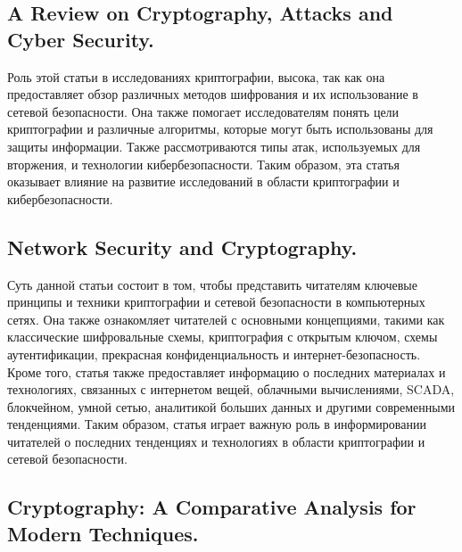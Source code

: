 \documentclass[14pt]{extarticle}
\begin{document}
\subsection{A Review on Cryptography, Attacks and Cyber Security.\cite{Article10}}

Роль этой статьи  в исследованиях криптографии, высока, так как она предоставляет обзор различных методов шифрования и их использование в сетевой безопасности. Она также помогает исследователям понять цели криптографии и различные алгоритмы, которые могут быть использованы для защиты информации.  Также рассмотриваются типы атак, используемых для вторжения, и технологии кибербезопасности. Таким образом, эта статья оказывает влияние на развитие исследований в области криптографии и кибербезопасности.

\subsection{Network Security and Cryptography.\cite{Article11}}
Суть данной статьи состоит в том, чтобы представить читателям ключевые принципы и техники криптографии и сетевой безопасности в компьютерных сетях. Она также ознакомляет читателей с основными концепциями, такими как классические шифровальные схемы, криптография с открытым ключом, схемы аутентификации, прекрасная конфиденциальность и интернет-безопасность. Кроме того, статья также предоставляет информацию о последних материалах и технологиях, связанных с интернетом вещей, облачными вычислениями, SCADA, блокчейном, умной сетью, аналитикой больших данных и другими современными тенденциями. Таким образом, статья играет важную роль в информировании читателей о последних тенденциях и технологиях в области криптографии и сетевой безопасности.


\subsection{Cryptography: A Comparative Analysis for Modern
Techniques.\cite{Article12}}
\end{document}
